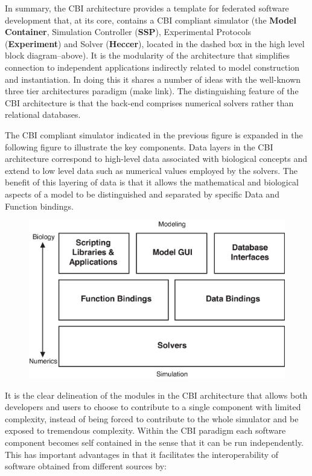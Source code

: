 \documentclass[12pt]{article}
\begin{document}
In summary, the CBI architecture provides a template for federated software development that, at its core, contains a CBI compliant simulator (the {\bf Model\,Container}, Simulation Controller ({\bf SSP}), Experimental Protocols ({\bf Experiment}) and Solver ({\bf Heccer}), located in the dashed box in the high level block diagram--above). It is the modularity of the architecture that simplifies connection to independent applications indirectly related to model construction and instantiation. In doing this it shares a number of ideas with the well-known three tier architectures paradigm (make link). The distinguishing feature of the CBI architecture is that the back-end comprises numerical solvers rather than relational databases.

The CBI compliant simulator indicated in the previous figure is expanded in the following figure to illustrate the key components. Data layers in the CBI architecture correspond to high-level data associated with biological concepts and extend to low level data such as numerical values employed by the solvers. The benefit of this layering of data is that it allows the mathematical and biological aspects of a model to be distinguished and separated by specific Data and Function bindings.

\begin{figure}[h]
  \centering
 \includegraphics[scale=0.75]{figures/G3-CBI-Architecture-HiLevel.eps}
  \label{fig:archover}
\end{figure}

It is the clear delineation of the modules in the CBI architecture that allows both developers and users to choose to contribute to a single component with limited complexity, instead of being forced to contribute to the whole simulator and be exposed to tremendous complexity. Within the CBI paradigm each software component becomes self contained in the sense that it can be run independently. This has important advantages in that it facilitates the interoperability of software obtained from different sources by:
\end{document}
